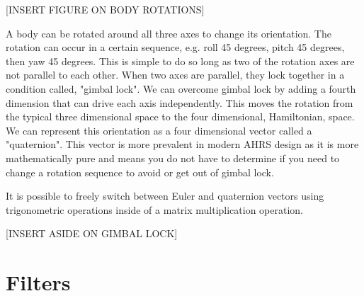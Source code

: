 [INSERT FIGURE ON BODY ROTATIONS]

A body can be rotated around all three axes to change its orientation.
The rotation can occur in a certain sequence, e.g. roll 45 degrees, pitch 45 degrees, then yaw 45 degrees.
This is simple to do so long as two of the rotation axes are not parallel to each other.
When two axes are parallel, they lock together in a condition called, "gimbal lock". 
We can overcome gimbal lock by adding a fourth dimension that can drive each axis independently.
This moves the rotation from the typical three dimensional space to the four dimensional, Hamiltonian, space.
We can represent this orientation as a four dimensional vector called a "quaternion".
This vector is more prevalent in modern AHRS design as it is more mathematically pure and means you do not have to determine if you need to change a rotation sequence to avoid or get out of gimbal lock.

It is possible to freely switch between Euler and quaternion vectors using trigonometric operations inside of a matrix multiplication operation.

[INSERT ASIDE ON GIMBAL LOCK]

\section{Filters} \label{sec:bkg_filters}
